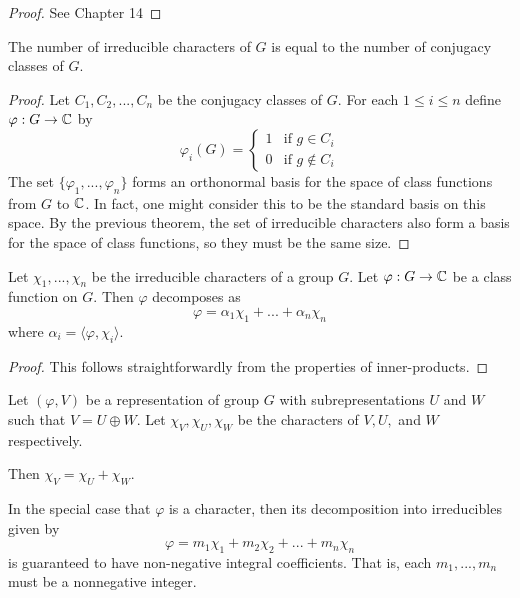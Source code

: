 \begin{proof}
    See \cite{James&Liebeck} Chapter 14
\end{proof}




\begin{corollary}
    The number of irreducible characters of $G$ is equal to the number of conjugacy classes of $G$.
\end{corollary}
\begin{proof}
    Let $C_1, C_2, ..., C_n$ be the conjugacy classes of $G$. For each $1 \leq i \leq n$ define $\varphi : G 
    \rightarrow \mathbb{C}$ by
    \[
        \varphi_i(G) =
        \begin{cases}
            1 &\text{if } g \in C_i \\
            0 &\text{if } g \not\in C_i
        \end{cases}
    \]
    The set $\{\varphi_1, ..., \varphi_n \}$ forms an orthonormal basis for the space of class functions from $G$ 
    to $\mathbb{C}$. In fact, one might consider this to be the standard basis on this space. By the previous theorem, the 
    set of irreducible characters also form a basis for the space of class functions, so they must be the same 
    size.
\end{proof}

    
\begin{corollary}
    Let $\chi_1, ..., \chi_n$ be the irreducible characters of a group $G$. Let $\varphi : G \rightarrow \mathbb{C}$ be a 
    class function on $G$. Then $\varphi$ decomposes as 
    \[
       \varphi = \alpha_1 \chi_1 + ... + \alpha_n \chi_n
    \]
    where $\alpha_i = \langle \varphi, \chi_i \rangle$.
\end{corollary}
\begin{proof}
    This follows straightforwardly from the properties of inner-products.
\end{proof}

\begin{lemma}
    Let $(\varphi, V)$ be a representation of group $G$ with subrepresentations $U$ and $W$ such that $V = U \oplus 
    W$. Let $\chi_V, \chi_U, \chi_W$ be the characters of $V, U,$ and $W$ respectively.

    Then $\chi_V = \chi_U + \chi_W$.
\end{lemma}

\begin{theorem}
    In the special case that $\varphi$ is a character, then its decomposition into irreducibles given by
    \[
        \varphi = m_1\chi_1 + m_2 \chi_2 + ... + m_n \chi_n
    \]
    is guaranteed to have non-negative integral coefficients. That is, each $m_1,...,m_n$ must be a nonnegative 
    integer.
\end{theorem}

